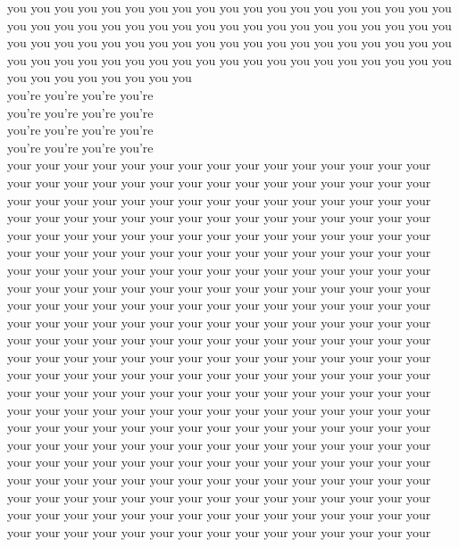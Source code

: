 you you you you you you you you you you you you you you you you you you you you you you you you you you you you you you you you you you you you you you you you you you you you you you you you you you you you you you you you you you you you you you you you you you you you you you you you you you you you you you you you you you you you\\
you're you're you're you're\\
you're you're you're you're\\
you're you're you're you're\\
you're you're you're you're\\
your your your your your your your your your your your your your your your your your your your your your your your your your your your your your your\\
your your your your your your your your your your your your your your your your your your your your your your your your your your your your your your\\
your your your your your your your your your your your your your your your your your your your your your your your your your your your your your your\\
your your your your your your your your your your your your your your your your your your your your your your your your your your your your your your\\
your your your your your your your your your your your your your your your your your your your your your your your your your your your your your your\\
your your your your your your your your your your your your your your your your your your your your your your your your your your your your your your\\
your your your your your your your your your your your your your your your your your your your your your your your your your your your your your your\\
your your your your your your your your your your your your your your your your your your your your your your your your your your your your your your\\
your your your your your your your your your your your your your your your your your your your your your your your your your your your your your your\\
your your your your your your your your your your your your your your your your your your your your your your your your your your your your your your\\
your your your your your your your your your your your your your your your your your your your your your your your your your your your your your your\\
